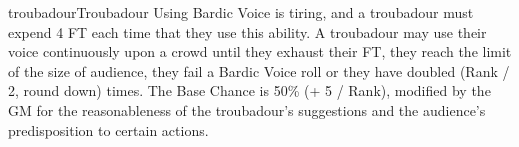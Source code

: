 \begin{Skill}[2.1]{troubadour}{Troubadour}
Using Bardic Voice is tiring, and a troubadour must expend 4 FT each
time that they use this ability.  A troubadour may use their voice
continuously upon a crowd until they exhaust their FT, they reach
the limit of the size of audience, they fail a Bardic Voice roll or
they have doubled (Rank / 2, round down) times.  The Base Chance is
50\% (+ 5 / Rank), modified by the GM for the reasonableness of the
troubadour’s suggestions and the audience’s predisposition to certain
actions.

\end{Skill}
